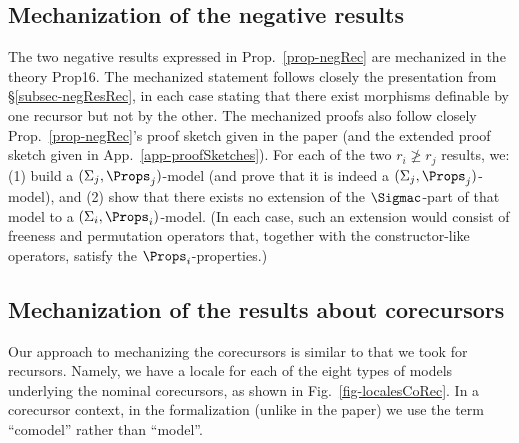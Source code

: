 \subsection{Mechanization of the negative results} 
\label{subsec-neg}
%
The two negative results expressed in Prop.~\ref{prop-negRec} are mechanized in the theory \textsf{Prop16}.  
The mechanized statement follows closely the presentation from \S\ref{subsec-negResRec}, in each case stating that there exist morphisms definable by one recursor but not by the other. 
%
The mechanized proofs  also follow closely Prop.~\ref{prop-negRec}'s proof sketch given in the paper (and the extended proof sketch given in App.~\ref{app-proofSketches}). For each of the two $r_i \not\geq r_j$ results, we:
(1) build a $(\Sigma_j,\Props_j)$-model (and prove that it is indeed a $(\Sigma_j,\Props_j)$-model), 
and (2) show that there exists no extension of 
	the $\Sigmac$-part of that model to a $(\Sigma_i,\Props_i)$-model. 
(In each case, such an extension would consist of freeness and permutation operators that, together with the constructor-like operators, satisfy the $\Props_i$-properties.) 


\subsection{Mechanization of the results about corecursors}
\label{subapp-isa-corecursors}

Our approach to mechanizing the corecursors is similar to that we took for recursors. Namely,  we have a locale for each of the eight types of models underlying the nominal corecursors, as shown in Fig.~\ref{fig-localesCoRec}. In a corecursor context, in the formalization (unlike in the paper) we use the term ``comodel'' rather than ``model''. 

\newcommand\PermFreeCo{\small \textsf{PermFree$\_$\allowbreak{}comodel}}
\newcommand\PermFreeVCo{\small \textsf{PermFreeV$\_$\allowbreak{}comodel}}
\newcommand\SwapFreeVCo{\small \textsf{SwapFreeV$\_$\allowbreak{}comodel}}
\newcommand\SwapFreshVCo{\small \textsf{SwapFreshV$\_$\allowbreak{}comodel}}
\newcommand\SwapFreshCo{\small \textsf{SwapFresh$\_$\allowbreak{}comodel}}
\newcommand\SwapFreshSMCo{\small \textsf{submodel$\_$\allowbreak{}SwapFresh$\_$\allowbreak{}comodel}}
\newcommand\SubstFreshCo{\small \textsf{SubstFresh$\_$\allowbreak{}comodel}}
\newcommand\RenamingCo{\small \textsf{Renaming$\_$\allowbreak{}comodel}}
\newcommand\RenamingFreshVCo{\small \textsf{RenamingFreshV$\_$\allowbreak{}comodel}}


